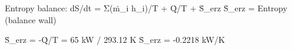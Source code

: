Entropy balance:  
dS/dt = Σ(ṁ_i h_i)/T + Q̇/T + Ṡ_erz  
Ṡ_erz = Entropy (balance wall)  

Ṡ_erz = -Q̇/T = 65 kW / 293.12 K  
Ṡ_erz = -0.2218 kW/K